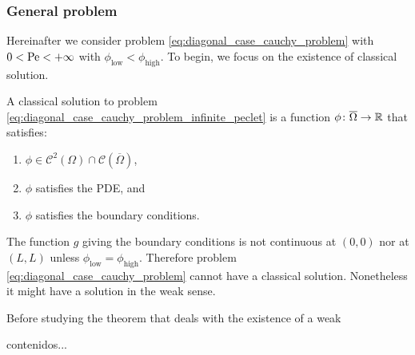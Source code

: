 \subsubsection{General problem}

Hereinafter we consider problem \eqref{eq:diagonal_case_cauchy_problem} with $0
< \mathrm{Pe} < +\infty$ with $\phi_\text{low} < \phi_\text{high}$. To begin, we
focus on the existence of classical solution.

\begin{definition}
	A classical solution to problem
	\eqref{eq:diagonal_case_cauchy_problem_infinite_peclet} is a function $\phi
	\colon \overline{\Omega} \rightarrow \mathbb{R}$ that satisfies:
	\begin{enumerate}[label={(\roman*)}, topsep=0pt]
		\item $\phi \in \mathcal{C}^2(\Omega) \cap
		\mathcal{C}(\overline{\Omega})$,
		\item $\phi$ satisfies the PDE, and
		\item $\phi$ satisfies the boundary conditions.
	\end{enumerate}
\end{definition}

\noindent
The function $g$ giving the boundary conditions is not continuous at $(0,0)$ nor
at $(L, L)$ unless $\phi_\text{low} = \phi_\text{high}$. Therefore problem
\eqref{eq:diagonal_case_cauchy_problem} cannot have a classical solution.
Nonetheless it might have a solution in the weak sense.

Before studying the theorem that deals with the existence of a weak 

\begin{definition}
	contenidos...
\end{definition}